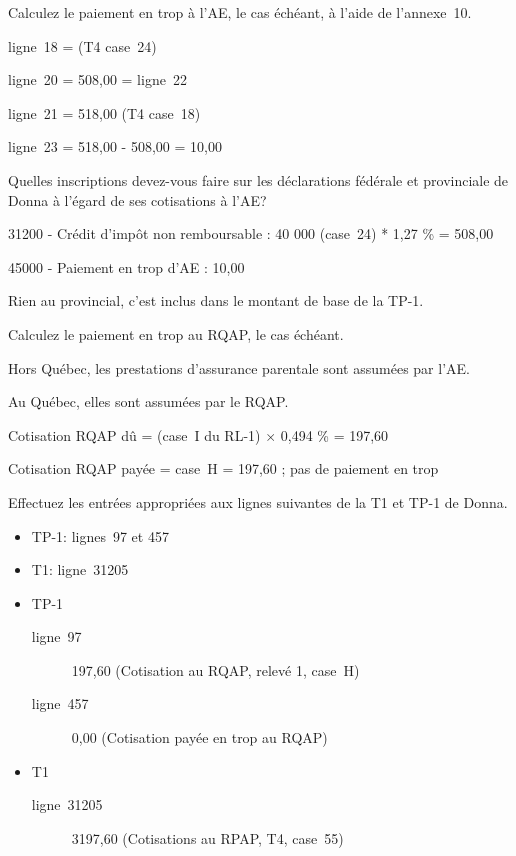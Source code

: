 \begin{question}
	Calculez le paiement en trop à l'AE, le cas échéant, à l'aide de l'annexe~10.
\end{question}
ligne~18 =  (T4 case~24)

ligne~20 = 508,00 = ligne~22

ligne~21 =  518,00 (T4 case~18)

ligne~23 = 518,00 - 508,00 = 10,00

\begin{question}
	Quelles inscriptions devez-vous faire sur les déclarations fédérale et provinciale de Donna à l'égard de ses cotisations à l'AE?
\end{question}
31200 - Crédit d'impôt non remboursable : 40 000 (case~24) * 1,27 \% = 508,00

45000 - Paiement en trop d'AE : 10,00

Rien au provincial, c'est inclus dans le montant de base de la TP-1.

\begin{question}
	Calculez le paiement en trop au RQAP, le cas échéant.
\end{question}
Hors Québec, les prestations d'assurance parentale sont assumées par l'AE.

Au Québec, elles sont assumées par le RQAP.

Cotisation RQAP dû =  (case~I du RL-1) $\times$ 0,494 \% = 197,60

Cotisation RQAP payée = case~H = 197,60 ; pas de paiement en trop

\begin{question}
	Effectuez les entrées appropriées aux lignes suivantes de la T1 et TP-1 de Donna.
	\begin{itemize}
		\item TP-1: lignes~97 et 457
		\item T1: ligne~31205
	\end{itemize}
\end{question}
\begin{itemize}
	\item TP-1
	\begin{description}
		\item[ligne~97] 197,60 (Cotisation au RQAP, relevé 1, case~H)
		\item[ligne~457] 0,00 (Cotisation payée en trop au RQAP)
	\end{description}
	\item T1
	\begin{description}
		\item[ligne~31205] 3197,60 (Cotisations au RPAP, T4, case~55)
	\end{description}
\end{itemize}

